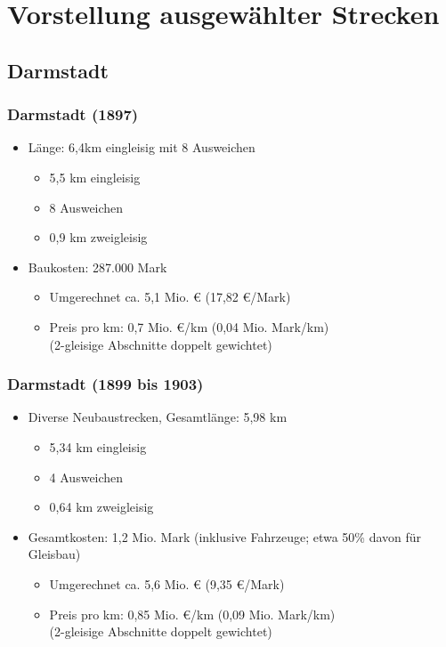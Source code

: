 \documentclass{beamer}
\begin{document}
\section{Vorstellung ausgewählter Strecken}

\subsection{Darmstadt}
\begin{frame}
  \frametitle{Darmstadt (1897)}

  \begin{itemize}
    \item Länge: 6,4km eingleisig mit 8 Ausweichen
      \begin{itemize}
        \item 5,5 km eingleisig
        \item 8 Ausweichen
        \item 0,9 km zweigleisig
      \end{itemize}
    \item Baukosten: 287.000 Mark
      \begin{itemize}
        \item Umgerechnet ca. 5,1 Mio. € (17,82 €/Mark)
        \item Preis pro km: 0,7 Mio. €/km (0,04 Mio. Mark/km)\\
          (2-gleisige Abschnitte doppelt gewichtet)
      \end{itemize}
  \end{itemize}
\end{frame}


\begin{frame}
  \frametitle{Darmstadt (1899 bis 1903)}

  \begin{itemize}
    \item Diverse Neubaustrecken, Gesamtlänge: 5,98 km
      \begin{itemize}
        \item 5,34 km eingleisig
        \item 4 Ausweichen
        \item 0,64 km zweigleisig
      \end{itemize}
    \item Gesamtkosten: 1,2 Mio. Mark (inklusive Fahrzeuge; etwa 50\%
      davon für Gleisbau)
      \begin{itemize}
        \item Umgerechnet ca. 5,6 Mio. € (9,35 €/Mark)
        \item Preis pro km: 0,85 Mio. €/km (0,09 Mio. Mark/km)\\
          (2-gleisige Abschnitte doppelt gewichtet)
      \end{itemize}
  \end{itemize}
\end{frame}
\end{document}
